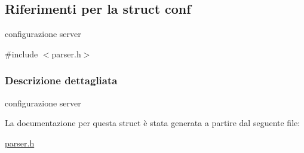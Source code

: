 \hypertarget{structconf}{}\subsection{Riferimenti per la struct conf}
\label{structconf}


configurazione server  




{\ttfamily \#include $<$parser.\+h$>$}



\subsubsection{Descrizione dettagliata}
configurazione server 

La documentazione per questa struct è stata generata a partire dal seguente file\+:\begin{DoxyCompactItemize}
\item 
\mbox{\hyperlink{parser_8h}{parser.\+h}}\end{DoxyCompactItemize}
